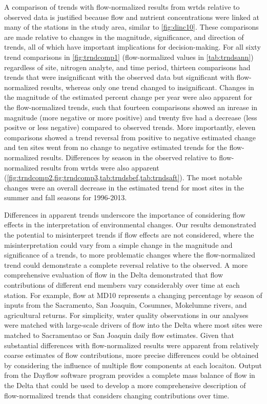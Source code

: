 \documentclass[journal = esthag, manuscript = article]{achemso}\usepackage[]{graphicx}\usepackage[]{color}
\begin{document}
A comparison of trends with flow-normalized results from \ac{wrtds} relative to observed data is justified because flow and nutrient concentrations were linked at many of the stations in the study area, similar to \cref{fig:dinc10}.  These comparisons are made relative to changes in the magnitude, significance, and direction of trends, all of which have important implications for decision-making. For all sixty trend comparisons in \cref{fig:trndcomp1} (flow-normalized values in \cref{tab:trndsann}) regardless of site, nitrogen analyte, and time period, thirteen comparisons had trends that were insignificant with the observed data but significant with flow-normalized results, whereas only one trend changed to insignificant. Changes in the magnitude of the estimated percent change per year were also apparent for the flow-normalized trends, such that fourteen comparisons showed an inrease in magnitude (more negative or more positive) and twenty five had a decrease (less positve or less negative) compared to observed trends.  More importantly, eleven comparisons showed a trend reversal from positive to negative estimated change and ten sites went from no change to negative estimated trends for the flow-normalized results. Differences by season in the observed relative to flow-normalized results from \ac{wrtds} were also apparent (\cref{fig:trndcomp2,fig:trndcomp3,tab:trndsbef,tab:trndsaft}).  The most notable changes were an overall decrease in the estimated trend for most sites in the summer and fall seasons for 1996-2013.

Differences in apparent trends underscore the importance of considering flow effects in the interpretation of environmental changes.  Our results demonstrated the potential to misinterpret trends if flow effects are not considered, where the misinterpretation could vary from a simple change in the magnitude and significance of a trends, to more problematic changes where the flow-normalized trend could demonstrate a complete reversal relative to the observed. A more comprehensive evaluation of flow in the Delta demonstrated that flow contributions of different end members vary considerably over time at each station\cite{Novick15}.  For example, flow at MD10 represents a changing percentage by season of inputs from the Sacramento, San Joaquin, Cosumnes, Mokelumne rivers, and agricultural returns.   For simplicity, water quality observations in our analyses were matched with large-scale drivers of flow into the Delta where most sites were matched to Sacramentao or San Joaquin daily flow estimates.  Given that substantial differences with flow-normalized results were apparent from relatively coarse estimates of flow contributions, more precise differences could be obtained by considering the influence of multiple flow components at each locaiton. Output from the Dayflow software program\cite{IEP16} provides a complete mass balance of flow in the Delta that could be used to develop a more comprehensive description of flow-normalized trends that considers changing contributions over time.  
\end{document}
